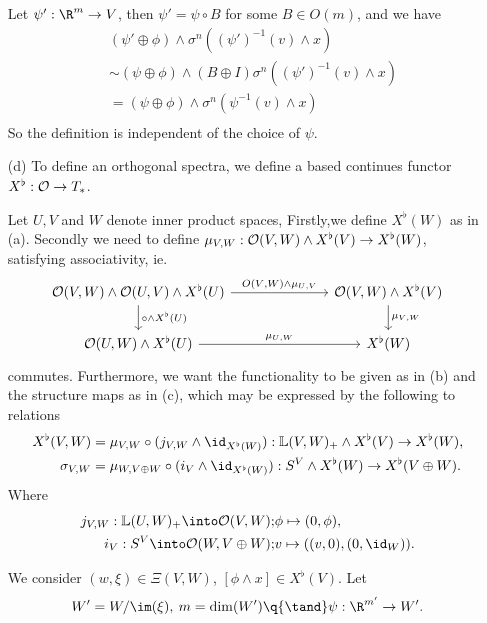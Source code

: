 \begin{exercise}[2]
\begin{enumerate}
Let $\psi' : \R^m \to V$, then $\psi' = \psi \circ B$ for some $B \in O(m)$, and
we have
\begin{align*}
&(\psi' \oplus \phi) \wedge \sigma^n ((\psi')^{-1}(v) \wedge x) \\
&\sim (\psi \oplus \phi) \wedge (B \oplus I)\sigma^n ((\psi')^{-1}(v) \wedge x) \\
&= (\psi \oplus \phi) \wedge \sigma^n (\psi^{-1}(v) \wedge x) \\
\end{align*}
So the definition is independent of the choice of $\psi$.

\item[(d)]
To define an orthogonal spectra, we define a based continues functor $X^\flat :
\mathcal{O} \to T_*$. 


Let $U, V$ and $W$ denote inner product spaces, 
Firstly,we define $X^\flat (W)$ as in (a). Secondly we need to define 
$\mu_{V,W}: \mathcal{O}(V, W) \wedge X^\flat(V) \to X^\flat(W)$, satisfying
associativity, ie. 
\[ \begin{tikzcd}[column sep = 7em]
\O(V, W) \wedge \O(U,V) \wedge X^\flat(U) 
\arrow[r, "O(V{,}W) \wedge \mu_{U{,}V}"] 
\arrow[d, "\circ \wedge X^\flat(U)"] 
& \O(V, W) \wedge X^\flat(V) 
\arrow[d, "\mu_{V{,}W}"] \\ 
\O(U,W) \wedge X^\flat(U) 
\arrow[r, "\mu_{U{,}W}"] 
& X^\flat(W)
\end{tikzcd} \]
commutes. Furthermore, we want the functionality to be given as in (b) and the
structure maps as in (c), which may be expressed by the following to relations
\begin{equation}
\begin{split}
X^\flat(V,W) &= \mu_{V, W} \circ (j_{V,W} \wedge \id_{X^\flat(W)}) : 
\L(V, W)_+ \wedge X^\flat (V) \to X^\flat(W),
\\
\sigma_{V,W} &= \mu_{W,V\oplus W} \circ (i_V \wedge \id_{X^\flat(W)}) :
S^V \wedge X^\flat (W) \to X^\flat(V \oplus W).
\end{split}
\end{equation}
Where 
\begin{align*}
j_{V,W} : \L(U,W)_+ \into \O(V,W); & \phi \mapsto (0,\phi), \\
i_V : S^V \into \O(W, V\oplus W); & v \mapsto ((v,0), (0,\id_W)).
\end{align*}


We consider $(w, \xi) \in \Xi(V,W)$, $[\phi \wedge x] \in X^\flat(V)$. Let 
\[ W' = W/\im(\xi), \: m = \dim(W') \q{\tand} \psi : \R^{m'} \to W'. \]


\end{enumerate}
\end{exercise}
